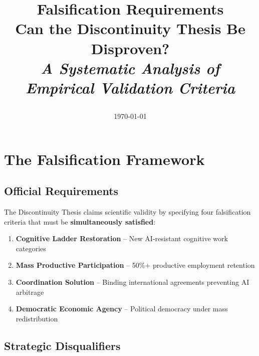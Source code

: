 \documentclass[11pt,a4paper]{article}
\title{
  \vspace{-1in}
  \begin{flushleft}
  \Huge\textbf{\textcolor{primaryblue}{Falsification Requirements}} \\
  \Large\textbf{\textcolor{secondaryblue}{Can the Discontinuity Thesis Be Disproven?}} \\
  \vspace{0.5cm}
  \large\textit{A Systematic Analysis of Empirical Validation Criteria}
  \end{flushleft}
}
\author{}
\date{\today}
\newcommand{\emphasis}[1]{\textbf{\textcolor{primaryblue}{#1}}}
\newcommand{\requirement}[1]{\textcolor{secondaryblue}{\textbf{#1}}}
\begin{document}
\maketitle
\thispagestyle{empty}

\begin{center}
\end{center}

\vspace{1cm}

\section{The Falsification Framework}

\subsection{Official Requirements}

The Discontinuity Thesis claims scientific validity by specifying four falsification criteria that must be \emphasis{simultaneously satisfied}:

\begin{enumerate}[leftmargin=*]
\item \requirement{Cognitive Ladder Restoration} -- New AI-resistant cognitive work categories
\item \requirement{Mass Productive Participation} -- 50\%+ productive employment retention  
\item \requirement{Coordination Solution} -- Binding international agreements preventing AI arbitrage
\item \requirement{Democratic Economic Agency} -- Political democracy under mass redistribution
\end{enumerate}

\subsection{Strategic Disqualifiers}
\end{document}
